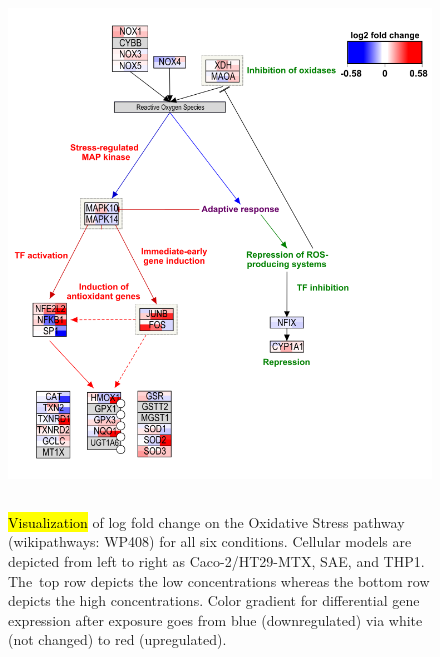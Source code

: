 \documentclass[ijms,article,accept,moreauthors,pdftex]{Definitions/mdpi}
\begin{document}
\begin{paracol}{2}
\begin{figure}[H]
\includegraphics[height=14cm,keepaspectratio]{fig3.png}
  \caption{\hl{Visualization} of log fold change on the Oxidative Stress pathway (wikipathways: WP408) for all six conditions.
{Cellular models} are depicted from left to right as {Caco-2/HT29-MTX}, SAE, and THP1. The~top row depicts the low concentrations whereas the bottom row depicts the high concentrations. {Color gradient for differential gene expression after exposure goes from blue (downregulated) via white (not changed) to red (upregulated).}}
\label{fig:fig3}
\end{figure}
\vspace{-12pt}


\end{paracol}
\end{document}
